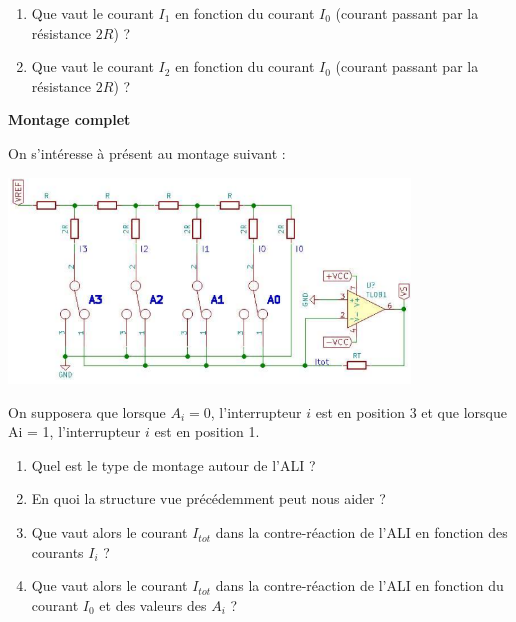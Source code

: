 \documentclass[10pt]{article} %
\begin{document}
\begin{enumerate}
	\item Que vaut le courant $I_1$ en fonction du courant $I_0$ (courant passant par la résistance $2R$) ?
	\item Que vaut le courant $I_2$ en fonction du courant $I_0$ (courant passant par la résistance $2R$) ?
\end{enumerate}

\textbf{Montage complet}

On s'intéresse à présent au montage suivant :

\begin{center}
	\includegraphics[width=0.8\textwidth]{images/R_2R_complet.png}
\end{center}

On supposera que lorsque $A_i = 0$, l'interrupteur $i$ est en position 3 et que lorsque Ai = 1, l'interrupteur $i$ est en position 1.

\begin{enumerate}
	\item Quel est le type de montage autour de l'ALI ?
	\item En quoi la structure vue précédemment peut nous aider ?
	\item Que vaut alors le courant $I_{tot}$ dans la contre-réaction de l'ALI en fonction des courants $I_i$ ?
	\item Que vaut alors le courant $I_{tot}$ dans la contre-réaction de l'ALI en fonction du courant $I_0$ et des
valeurs des $A_i$ ?
\end{enumerate}
\end{document}
